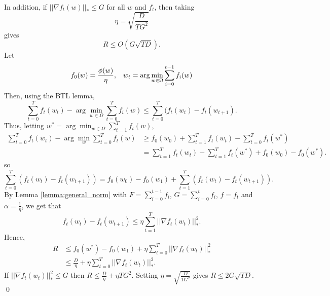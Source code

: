 \documentclass[11pt]{article}
\begin{document}
~\\\noindent In addition, if $||\nabla f_t (w)||_* \leq G$ for all $w$ and $f_t$, then taking
$$\eta = \sqrt{\frac{D}{TG^2}}$$
gives 
$$R \leq O(G\sqrt{TD}).$$
\proof Let 
$$f_0(w) = \frac{\phi(w)}{\eta}, \hspace{3mm} w_t = \arg \min_{w\in \Omega} \sum_{i=0}^{t-1}f_i(w)$$
Then, using the BTL lemma, 
\begin{equation*}
    \sum_{t=0}^T f_t(w_t) - \arg \min_{w\in \Omega} \sum_{t=0}^T f_i(w) \leq \sum_{t=0}^T (f_t(w_t) - f_t(w_{t+1}).
\end{equation*}
Thus, letting $w^* = \arg \min_{w\in \Omega} \sum_{t=1}^T f_t(w)$, 
\begin{equation*}
    \begin{split}
        \sum_{t=0}^T f_t(w_t) - \arg \min_w \sum_{t=0}^T f_t(w) & \geq f_0(w_0) + \sum_{t=1}^T f_t(w_t) - \sum_{t=0}^T f_t(w^*)\\
        & = \sum_{t=1}^T f_t(w_t) - \sum_{t=1}^T f_t(w^*) + f_0(w_0) - f_0(w^*).
    \end{split}
\end{equation*}
so 
$$\sum_{t=0}^T (f_t(w_t) - f_t(w_{t+1})) =  f_0(w_0) - f_0(w_1) + \sum_{t=1}^T (f_t(w_t) - f_t(w_{t+1})).$$
By Lemma \ref{lemma:general_norm} with $F = \sum_{i=0}^{t-1} f_i$, $G = \sum_{i=0}^t f_i$, $f = f_t$ and $\alpha = \frac{1}{\eta}$, 
we get that
$$f_t(w_t) - f_t(w_{t+1}) \leq \eta \sum_{t=1}^T ||\nabla f_t(w_t)||_*^2.$$
 Hence, 
\begin{equation*}
    \begin{split}
R & \leq f_0(w^*) - f_0(w_1) + \eta \sum_{t=0}^T ||\nabla f_t (w_t)||^2_*\\
& \leq \frac{D}{\eta} + \eta \sum_{t=0}^T ||\nabla f_t(w_t)||^2_*.
    \end{split}
\end{equation*}
If $||\nabla f_t(w_t)||^2_* \leq G$ then $R \leq \frac{D}{\eta} + \eta TG^2$. Setting $\eta = \sqrt{\frac{D}{TG^2}}$ gives $R \leq 2G\sqrt{TD}$. \qed 
\end{document}
